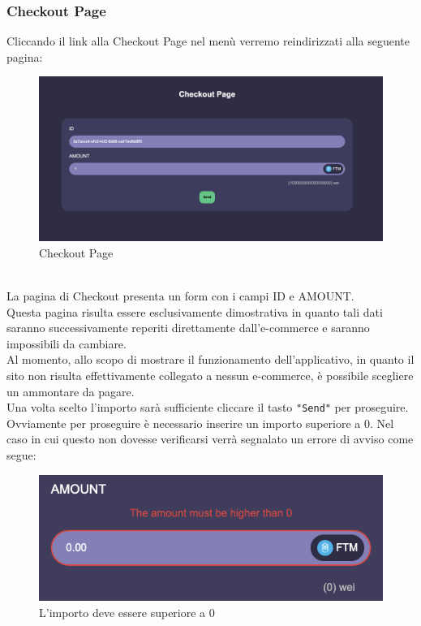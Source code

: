         \subsubsection{Checkout Page} \label{subsection: CheckoutPage}
        Cliccando il link alla Checkout Page nel menù verremo reindirizzati alla seguente pagina:
        \begin{figure}[H]
            \centering
            \includegraphics[scale=0.3]{immagini/Checkout/Checkout.png}
            \caption{Checkout Page}
        \end{figure}
        \textbf{}\\
        La pagina di Checkout presenta un form con i campi ID e AMOUNT.\\
        Questa pagina risulta essere esclusivamente dimostrativa in quanto tali dati saranno successivamente reperiti direttamente dall'e-commerce\glo{} e saranno impossibili da cambiare.\\
        Al momento, allo scopo di mostrare il funzionamento dell'applicativo, in quanto il sito non risulta effettivamente collegato a nessun e-commerce\glo{}, è possibile scegliere un ammontare da pagare. \\
        Una volta scelto l'importo sarà sufficiente cliccare il tasto \texttt{"Send"} per proseguire.\\
        Ovviamente per proseguire è necessario inserire un importo superiore a 0. Nel caso in cui questo non dovesse verificarsi verrà segnalato un errore di avviso come segue:
        \begin{figure}[H]
            \centering
            \includegraphics[scale=0.4]{immagini/Checkout/biggerThanZero.png}
            \caption{L'importo deve essere superiore a 0}
        \end{figure}
